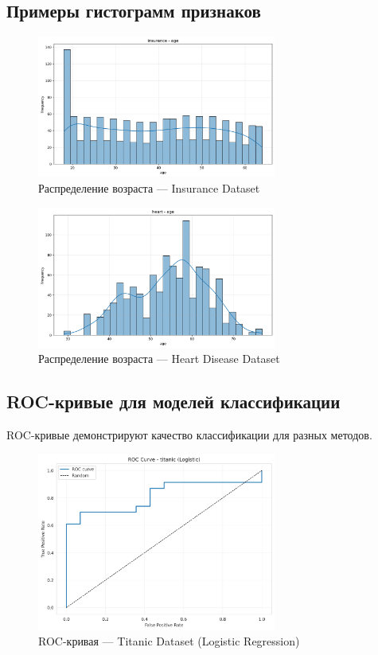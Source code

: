 \documentclass[a4paper]{article}
\begin{document}
\subsection{Примеры гистограмм признаков}

\begin{figure}[H]
\centering
\includegraphics[width=0.7\textwidth]{images/hist_insurance_age.png}
\caption{Распределение возраста — Insurance Dataset}
\end{figure}

\begin{figure}[H]
\centering
\includegraphics[width=0.7\textwidth]{images/hist_heart_age.png}
\caption{Распределение возраста — Heart Disease Dataset}
\end{figure}

\subsection{ROC-кривые для моделей классификации}

ROC-кривые демонстрируют качество классификации для разных методов.

\begin{figure}[H]
\centering
\includegraphics[width=0.7\textwidth]{images/roc_curve_titanic_logistic.png}
\caption{ROC-кривая — Titanic Dataset (Logistic Regression)}
\end{figure}
\end{document}
